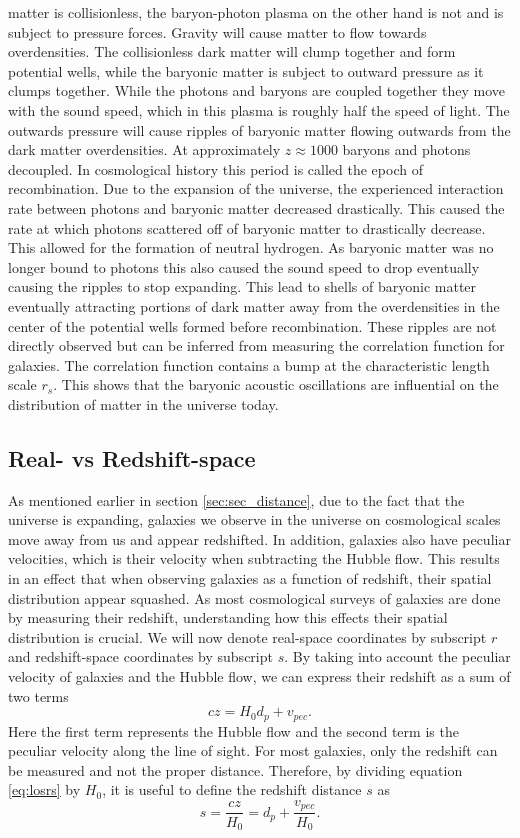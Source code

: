matter is collisionless, the baryon-photon plasma on the other hand is not and
is subject to pressure forces. Gravity will cause matter to flow towards
overdensities. The collisionless dark matter will clump together and form
potential wells, while the baryonic matter is subject to outward pressure as it clumps
together. While the photons and baryons are coupled together they move with the
sound speed, which in this plasma is roughly half the speed of light. The
outwards pressure will cause ripples of baryonic matter flowing outwards from the
dark matter overdensities. At approximately $z\approx 1000$ baryons and photons
decoupled. In cosmological history this period is called the epoch of
recombination. Due to the expansion of the universe, the experienced interaction rate between
photons and baryonic matter decreased drastically. This caused the
rate at which photons scattered off of baryonic matter to drastically decrease. This allowed for the formation of neutral hydrogen.
As baryonic matter was no longer bound to photons this also caused the sound
speed to drop eventually causing the ripples to stop expanding. This lead to
shells of baryonic matter eventually attracting
portions of dark matter away from the overdensities in the center of the
potential wells formed before recombination. These ripples are not directly
observed but can be inferred from measuring the correlation function for
galaxies. The correlation function contains a bump at the characteristic length
scale $r_s$. This shows that the baryonic acoustic oscillations are influential on the distribution of
matter in the universe today.

\subsection{Real- vs Redshift-space}
As mentioned earlier in section \ref{sec:sec_distance}, due to the fact that the
universe is expanding, galaxies we observe in the universe on cosmological scales
move away from us and appear redshifted. In addition, galaxies also have peculiar
velocities, which is their velocity when subtracting the Hubble flow. This results in an effect that when observing galaxies
as a function of redshift, their spatial distribution appear squashed. As most
cosmological surveys of galaxies are done by measuring their redshift,
understanding how this effects their spatial distribution is crucial.
We will now denote real-space coordinates by subscript $r$ and redshift-space
coordinates by subscript $s$. By taking into account the peculiar velocity of
galaxies and the Hubble flow, we can express their redshift as a sum of two
terms
\begin{equation}\label{eq:losrs}
    cz=H_0d_p+v_{pec}.
\end{equation}
Here the first term represents the Hubble flow and the second term is the
peculiar velocity along the line of sight. For most galaxies, only the redshift
can be measured and not the proper distance. Therefore, by dividing equation
\ref{eq:losrs} by $H_0$, it is useful to define
the redshift distance $s$ as
\begin{equation}
    s = \frac{cz}{H_0}=d_p+\frac{v_{pec}}{H_0}.
\end{equation}
\\

